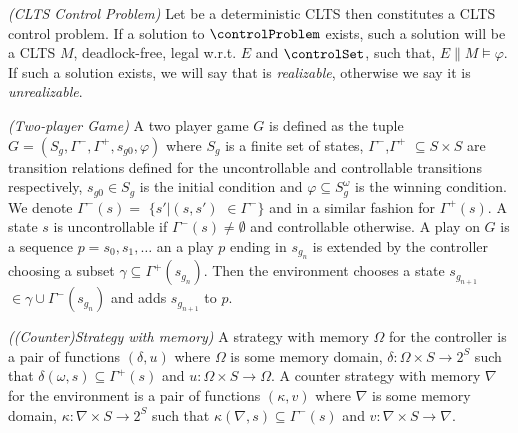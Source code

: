 \begin{definition}
	\label{def:clts_control_problem} \emph{(CLTS Control Problem)} 
	Let  be a deterministic CLTS then \controlProblemDef constitutes a CLTS control problem. If a solution to $\controlProblem$ exists, such a solution will be a CLTS $M$, deadlock-free, legal w.r.t. $E$ and $\controlSet$, such that, $E \parallel M \models \varphi$. If such a solution exists, we will say that \controlProblem is \emph{realizable}, otherwise we say it is \emph{unrealizable}.
\end{definition}


\begin{definition}\label{def:twoplayer-game}\emph{(Two-player Game)}
	A two player game $G$ is defined as the tuple $G=(S_g,\Gamma^{-},\Gamma^{+},s_{g0}, \varphi)$ where $S_{g}$ is a finite set of states, $\Gamma^{-}$,$\Gamma^{+}$ $\subseteq S\times S$ are transition relations defined for the uncontrollable and controllable transitions respectively, $s_{g0}\in S_{g}$ is the initial condition and $\varphi \subseteq S_{g}^{\omega}$ is the winning condition.  We denote $\Gamma^{-}(s) =$ $\{s'|(s,s')$ $\in \Gamma^{-}\}$ and in a similar fashion for $\Gamma^{+}(s)$. A state $s$ is uncontrollable if $\Gamma^{-}(s)\neq \emptyset$ and controllable otherwise.  A play on $G$ is a sequence $p=s_0,s_1,\ldots$ an a play $p$ ending in $s_{g_{n}}$ is extended by the controller choosing a subset $\gamma \subseteq \Gamma^{+}(s_{g_{n}})$.  Then the environment chooses a state $s_{g_{n+1}}$ $\in \gamma \cup \Gamma^{-}(s_{g_{n}})$ and adds $s_{g_{n+1}}$ to $p$.
\end{definition}

\begin{definition}\label{def:strategy}\emph{((Counter)Strategy with memory)}
	A strategy with memory $\Omega$ for the controller is a pair of functions $(\delta, u)$ where $\Omega$ is some memory domain, $\delta:\Omega\times S \rightarrow 2^{S}$ such that $\delta(\omega, s) \subseteq \Gamma^{+}(s)$ and $u:\Omega \times S \rightarrow \Omega$.
	A counter strategy with memory $\nabla$ for the environment is a pair of functions $(\kappa, v)$ where $\nabla$ is some memory domain, $\kappa:\nabla\times S \rightarrow 2^{S}$ such that $\kappa(\nabla, s) \subseteq \Gamma^{-}(s)$ and $v:\nabla \times S \rightarrow \nabla$.
\end{definition}


